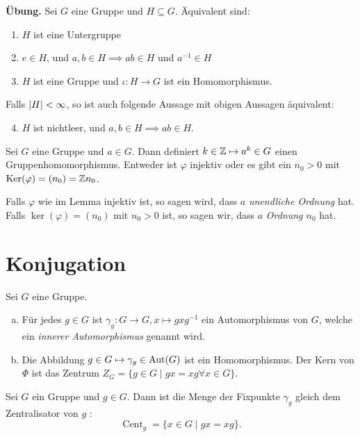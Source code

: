 \textbf{Übung.} Sei $G$ eine Gruppe und $H \subseteq G$. Äquivalent sind:
\begin{enumerate}[1)]
	\item $H$ ist eine Untergruppe
	\item $e \in H$, und $a,b \in H \implies ab \in H$ und $a^{-1} \in H$ 
	\item $H$ ist eine Gruppe und $\iota: H \to G$ ist ein Homomorphismus.
\end{enumerate}
Falls $\abs{H} < \infty$, so ist auch folgende Aussage mit obigen Aussagen äquivalent:
\begin{enumerate}[1)]
	\setcounter{enumi}{3}
	\item $H$ ist nichtleer, und $a,b \in H \implies ab \in H$.
\end{enumerate}



\begin{lemma}
	Sei $G$ eine Gruppe und $a \in G$. Dann definiert $k \in \mathbb{Z} \mapsto a^{k} \in G$ einen Gruppenhomomorphismus.
	Entweder ist $\varphi$ injektiv oder es gibt ein $n_0 > 0$ mit $\operatorname{Ker}(\varphi) = (n_0) = \mathbb{Z} n_0$.
\end{lemma}

\begin{definition}
	Falls $\varphi$ wie im Lemma injektiv ist, so sagen wird, dass $a$ \emph{unendliche Ordnung} hat.
	Falls $\ker(\varphi) = (n_0)$ mit $n_0 > 0$ ist, so sagen wir, dass $a$ \emph{Ordnung $n_0$} hat.
\end{definition}



\section{Konjugation}

\begin{lemma}
	Sei $G$ eine Gruppe.
	\begin{enumerate}[a)]
		\item Für jedes $g \in G$ ist $\gamma_{g}: G \to G, x \mapsto g x g^{-1}$ ein Automorphismus von $G$, welche ein \emph{innerer Automorphismus} genannt wird.
		\item Die Abbildung $g \in G \mapsto \gamma_{g} \in \operatorname{Aut}(G)$ ist ein Homomorphismus.
			Der Kern von $\Phi$ ist das Zentrum $Z_{G} = \{g \in G \mid gx = xg \forall x \in G\} $.
	\end{enumerate}
\end{lemma}


\begin{definition}
	Sei $G$ ein Gruppe und $g \in G$. Dann ist die Menge der Fixpunkte $\gamma_{g}$ gleich dem Zentralisator von $g$ :
	\[
		\operatorname{Cent}_{g} = \{x \in G \mid gx = xg\} 
	.\] 
\end{definition}

